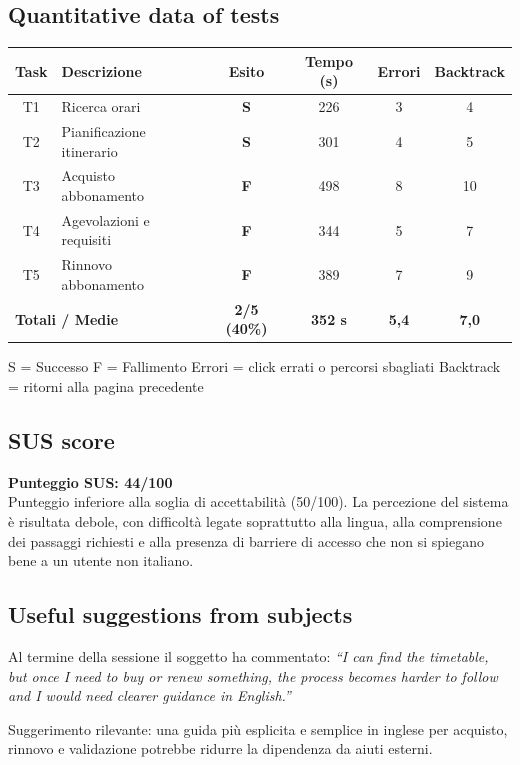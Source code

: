 \documentclass[11pt,a4paper]{article}
\begin{document}
\subsection*{Quantitative data of tests}
\begin{tcolorbox}[colback=backgroundColor,colframe=borderColor,arc=2mm]
\begin{center}
\renewcommand{\arraystretch}{1.4}
\begin{tabular}{clcccc}
\toprule
\textbf{Task} & \textbf{Descrizione} &
\textbf{Esito} & \textbf{Tempo (s)} &
\textbf{Errori} & \textbf{Backtrack} \\
\midrule
T1 & Ricerca orari             & \textbf{S} & 226 & 3 & 4 \\
T2 & Pianificazione itinerario & \textbf{S} & 301 & 4 & 5 \\
T3 & Acquisto abbonamento      & \textbf{F} & 498 & 8 & 10 \\
T4 & Agevolazioni e requisiti   & \textbf{F} & 344 & 5 & 7 \\
T5 & Rinnovo abbonamento       & \textbf{F} & 389 & 7 & 9 \\
\midrule
\multicolumn{2}{l}{\textbf{Totali / Medie}} &
\textbf{2/5 (40\%)} & \textbf{352 s} &
\textbf{5,4} & \textbf{7,0} \\
\bottomrule
\end{tabular}
\end{center}
\vspace{0.3cm}
\small S = Successo \quad F = Fallimento \quad
Errori = click errati o percorsi sbagliati \quad
Backtrack = ritorni alla pagina precedente
\end{tcolorbox}

\subsection*{SUS score}
\begin{tcolorbox}[colback=backgroundColor,colframe=borderColor,arc=2mm]
\textbf{Punteggio SUS: 44/100}\\[0.2cm]
\small Punteggio inferiore alla soglia di accettabilità (50/100). La percezione del sistema è risultata debole, con difficoltà legate soprattutto alla lingua, alla comprensione dei passaggi richiesti e alla presenza di barriere di accesso che non si spiegano bene a un utente non italiano.
\end{tcolorbox}

\subsection*{Useful suggestions from subjects}
\begin{tcolorbox}[colback=backgroundColor,colframe=borderColor,arc=2mm]
Al termine della sessione il soggetto ha commentato: \textit{``I can find the timetable, but once I need to buy or renew something, the process becomes harder to follow and I would need clearer guidance in English.''}

Suggerimento rilevante: una guida più esplicita e semplice in inglese per acquisto, rinnovo e validazione potrebbe ridurre la dipendenza da aiuti esterni.
\end{tcolorbox}
\end{document}
